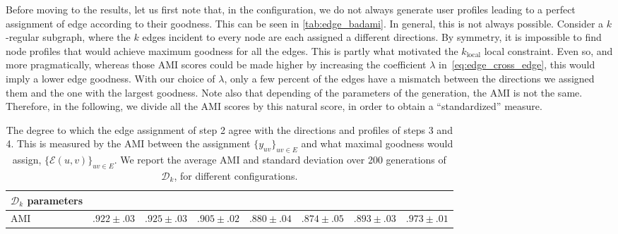 Before moving to the results, let us first note that,
in the  configuration, we do not always
generate user profiles leading to a perfect assignment of edge according to their goodness. This can
be seen in \autoref{tab:edge_badami}. In
general, this is not always possible. Consider a $k$-regular subgraph, where the $k$ edges incident
to every node are each assigned a different directions. By symmetry, it is impossible to find node
profiles that would achieve maximum goodness for all the edges. This is partly what motivated the
$k_{\mathrm{local}}$ local constraint. Even so, and more pragmatically, whereas those AMI scores
could be made higher by increasing the coefficient $\lambda$ in~\eqref{eq:edge_cross_edge}, this would
imply a lower edge goodness. With our choice of $\lambda$, only a few percent of the edges have a mismatch
between the directions we assigned them and the one with the largest goodness. Note also that
depending of the parameters of the generation, the AMI is not the same. Therefore, in the following,
we divide all the AMI scores by this natural score, in order to obtain a \enquote{standardized} measure.

\begin{table}[htb]
\begin{adjustwidth}{-1.5cm}{}
  \centering
  \small
  \caption[Qualite of our synthetic instances according to generation parameters]{The degree to
    which the edge assignment of step 2 agree with the directions and profiles
    of steps 3 and 4. This is measured by the AMI between the assignment $\{y_{uv}\}_{uv \in E}$ and
    what maximal goodness would assign, \ie{} $\{\mathcal{E}(u,v)\}_{uv \in E}$. We report the
    average AMI and standard deviation over 200 generations of $\mathcal{D}_k$, for different
    configurations.  \label{tab:edge_badami}}
\begin{tabular}{lccccccc}
  \toprule
  {$\mathcal{D}_k$ parameters}  & {{}}   & {\smallk{}}    & {\largek{}}    & {\smallo{}}    & {\largeo{}}    & {\fdirs{}}     & {\larged{}}    \\
  \midrule
  AMI & $.922 \pm .03$ & $.925 \pm .03$ & $.905 \pm .02$ & $.880 \pm .04$ & $.874 \pm .05$ & $.893 \pm .03$ & $.973 \pm .01$ \\
  \bottomrule
\end{tabular}
\end{adjustwidth}
\end{table}

